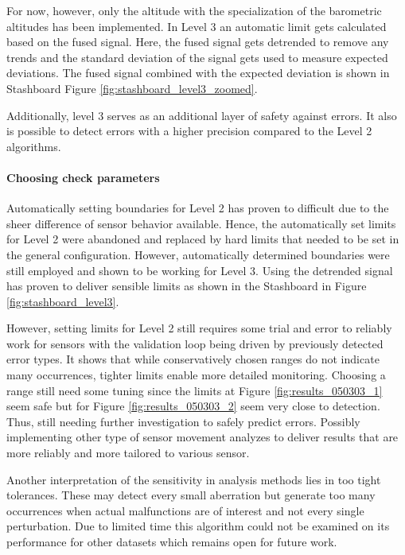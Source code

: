 For now, however, only the altitude with the specialization of the barometric altitudes has been implemented. In Level 3 an automatic limit gets calculated based on the fused signal. Here, the fused signal gets detrended to remove any trends and the standard deviation of the signal gets used to measure expected deviations. The fused signal combined with the expected deviation is shown in Stashboard Figure \ref{fig:stashboard_level3_zoomed}.

Additionally, level 3 serves as an additional layer of safety against errors. It also is possible to detect errors with a higher precision compared to the Level 2 algorithms.




\paragraph{Choosing check parameters}

Automatically setting boundaries for Level 2 has proven to difficult due to the sheer difference of sensor behavior available. Hence, the automatically set limits for Level 2 were abandoned and replaced by hard limits that needed to be set in the general configuration. However, automatically determined boundaries were still employed and shown to be working for Level 3. Using the detrended signal has proven to deliver sensible limits as shown in the Stashboard in Figure \ref{fig:stashboard_level3}.

However, setting limits for Level 2 still requires some trial and error to reliably work for sensors with the validation loop being driven by previously detected error types. It shows that while conservatively chosen ranges do not indicate many occurrences, tighter limits enable more detailed monitoring. Choosing a range still need some tuning since the limits at Figure \ref{fig:results_050303_1} seem safe but for Figure \ref{fig:results_050303_2} seem very close to detection. Thus, still needing further investigation to safely predict errors. Possibly implementing other type of sensor movement analyzes to deliver results that are more reliably and more tailored to various sensor.

Another interpretation of the sensitivity in analysis methods lies in too tight tolerances. These may detect every small aberration but generate too many occurrences when actual malfunctions are of interest and not every single perturbation. Due to limited time this algorithm could not be examined on its performance for other datasets which remains open for future work.


